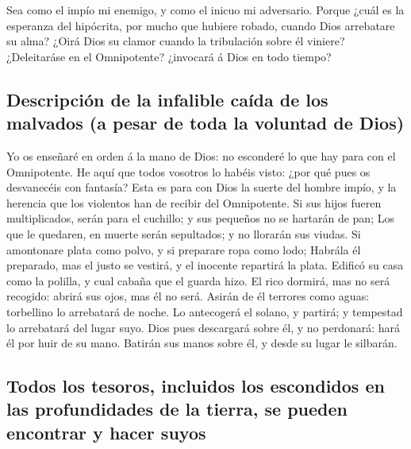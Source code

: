  Sea como el impío mi enemigo, y como el inicuo mi
adversario.  Porque ¿cuál es la esperanza del hipócrita, por
mucho que hubiere robado, cuando Dios arrebatare su alma? 
¿Oirá Dios su clamor cuando la tribulación sobre él viniere?
 ¿Deleitaráse en el Omnipotente? ¿invocará á Dios en todo
tiempo?

\hypertarget{descripciuxf3n-de-la-infalible-cauxedda-de-los-malvados-a-pesar-de-toda-la-voluntad-de-dios}{%
\subsection{Descripción de la infalible caída de los malvados (a pesar
de toda la voluntad de
Dios)}\label{descripciuxf3n-de-la-infalible-cauxedda-de-los-malvados-a-pesar-de-toda-la-voluntad-de-dios}}

 Yo os enseñaré en orden á la mano de Dios: no esconderé lo
que hay para con el Omnipotente.  He aquí que todos
vosotros lo habéis visto: ¿por qué pues os desvanecéis con fantasía?
 Esta es para con Dios la suerte del hombre impío, y la
herencia que los violentos han de recibir del Omnipotente. 
Si sus hijos fueren multiplicados, serán para el cuchillo; y sus
pequeños no se hartarán de pan;  Los que le quedaren, en
muerte serán sepultados; y no llorarán sus viudas.  Si
amontonare plata como polvo, y si preparare ropa como lodo;
 Habrála él preparado, mas el justo se vestirá, y el
inocente repartirá la plata.  Edificó su casa como la
polilla, y cual cabaña que el guarda hizo.  El rico
dormirá, mas no será recogido: abrirá sus ojos, mas él no será.
 Asirán de él terrores como aguas: torbellino lo arrebatará
de noche.  Lo antecogerá el solano, y partirá; y tempestad
lo arrebatará del lugar suyo.  Dios pues descargará sobre
él, y no perdonará: hará él por huir de su mano.  Batirán
sus manos sobre él, y desde su lugar le silbarán.

\hypertarget{todos-los-tesoros-incluidos-los-escondidos-en-las-profundidades-de-la-tierra-se-pueden-encontrar-y-hacer-suyos}{%
\subsection{Todos los tesoros, incluidos los escondidos en las
profundidades de la tierra, se pueden encontrar y hacer
suyos}\label{todos-los-tesoros-incluidos-los-escondidos-en-las-profundidades-de-la-tierra-se-pueden-encontrar-y-hacer-suyos}}

